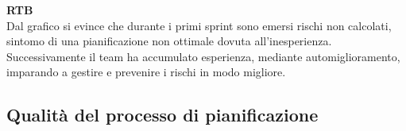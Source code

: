 \begin{flushleft}
\textbf{RTB} \\
Dal grafico si evince che durante i primi sprint sono emersi rischi non calcolati, sintomo di una pianificazione non ottimale dovuta all'inesperienza. Successivamente il team ha accumulato esperienza, mediante automiglioramento, imparando a gestire e prevenire i rischi in modo migliore. \\
\end{flushleft}

\newpage
\subsection{Qualità del processo di pianificazione}
